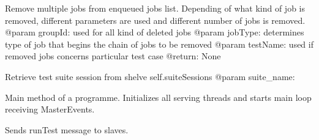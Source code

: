 \documentclass[letterpaper,10pt,english]{sphinxmanual}
\begin{document}
\begin{fulllineitems}

\begin{fulllineitems}
\label{ref-manual/XrdTestMaster:XrdTestMaster.XrdTestMaster.removeJobs}
Remove multiple jobs from enqueued jobs list. Depending of what kind of
job is removed, different parameters are used and different number of
jobs is removed.
@param groupId: used for all kind of deleted jobs
@param jobType: determines type of job that begins the chain of
jobs to be removed
@param testName: used if removed jobs concerns particular test case
@return: None

\end{fulllineitems}


\begin{fulllineitems}
\label{ref-manual/XrdTestMaster:XrdTestMaster.XrdTestMaster.retrieveAllSuiteSessions}
\end{fulllineitems}


\begin{fulllineitems}
\label{ref-manual/XrdTestMaster:XrdTestMaster.XrdTestMaster.retrieveSuiteSession}
Retrieve test suite session from shelve self.suiteSessions
@param suite\_name:

\end{fulllineitems}


\begin{fulllineitems}
\label{ref-manual/XrdTestMaster:XrdTestMaster.XrdTestMaster.run}
Main method of a programme. Initializes all serving threads and starts
main loop receiving MasterEvents.

\end{fulllineitems}


\begin{fulllineitems}
\label{ref-manual/XrdTestMaster:XrdTestMaster.XrdTestMaster.runTestCase}
Sends runTest message to slaves.


\end{fulllineitems}
\end{fulllineitems}
\end{document}
